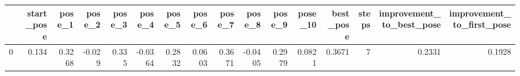 \begin{tabular}{lrrrrrrrrrrrrrrr}
\toprule
{} &  start\_pose &  pose\_1 &  pose\_2 &  pose\_3 &  pose\_4 &  pose\_5 &  pose\_6 &  pose\_7 &  pose\_8 &  pose\_9 &  pose\_10 &  best\_pose &  steps &  improvement\_to\_best\_pose &  improvement\_to\_first\_pose \\
\midrule
0 &       0.134 &  0.3268 &  -0.029 &   0.335 & -0.0364 &  0.2832 &  0.0603 &  0.3671 & -0.0405 &  0.2979 &   0.0821 &     0.3671 &      7 &                    0.2331 &                     0.1928 \\
\bottomrule
\end{tabular}
